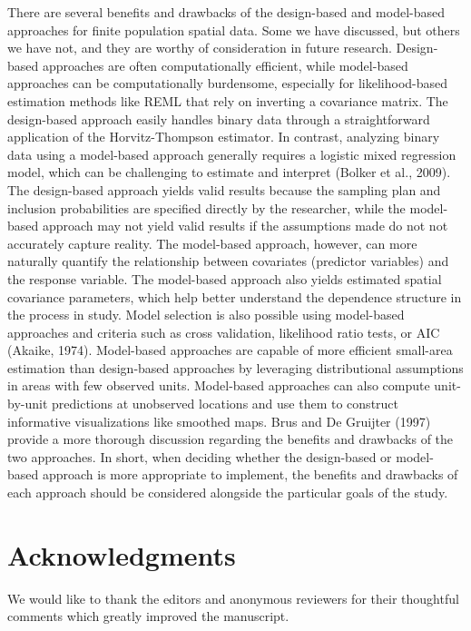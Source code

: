 \documentclass[]{elsarticle} %
\begin{document}
There are several benefits and drawbacks of the design-based and
model-based approaches for finite population spatial data. Some we have
discussed, but others we have not, and they are worthy of consideration
in future research. Design-based approaches are often computationally
efficient, while model-based approaches can be computationally
burdensome, especially for likelihood-based estimation methods like REML
that rely on inverting a covariance matrix. The design-based approach
easily handles binary data through a straightforward application of the
Horvitz-Thompson estimator. In contrast, analyzing binary data using a
model-based approach generally requires a logistic mixed regression
model, which can be challenging to estimate and interpret (Bolker et
al., 2009). The design-based approach yields valid results because the
sampling plan and inclusion probabilities are specified directly by the
researcher, while the model-based approach may not yield valid results
if the assumptions made do not not accurately capture reality. The
model-based approach, however, can more naturally quantify the
relationship between covariates (predictor variables) and the response
variable. The model-based approach also yields estimated spatial
covariance parameters, which help better understand the dependence
structure in the process in study. Model selection is also possible
using model-based approaches and criteria such as cross validation,
likelihood ratio tests, or AIC (Akaike, 1974). Model-based approaches
are capable of more efficient small-area estimation than design-based
approaches by leveraging distributional assumptions in areas with few
observed units. Model-based approaches can also compute unit-by-unit
predictions at unobserved locations and use them to construct
informative visualizations like smoothed maps. Brus and De Gruijter
(1997) provide a more thorough discussion regarding the benefits and
drawbacks of the two approaches. In short, when deciding whether the
design-based or model-based approach is more appropriate to implement,
the benefits and drawbacks of each approach should be considered
alongside the particular goals of the study.

\hypertarget{acknowledgments}{%
\section*{Acknowledgments}\label{acknowledgments}}

We would like to thank the editors and anonymous reviewers for their
thoughtful comments which greatly improved the manuscript.
\end{document}
